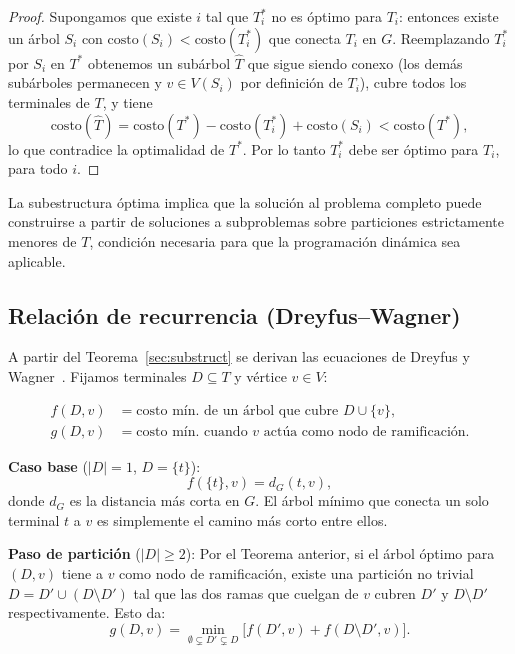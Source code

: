 \documentclass[11pt]{article}
\begin{document}
\begin{proof}
Supongamos que existe $i$ tal que $T^*_i$ no es \'optimo para $T_i$: entonces
existe un \'arbol $S_i$ con $\mathrm{costo}(S_i) < \mathrm{costo}(T^*_i)$ que
conecta $T_i$ en $G$.  Reemplazando $T^*_i$ por $S_i$ en $T^*$ obtenemos un
sub\'arbol $\hat{T}$ que sigue siendo conexo (los dem\'as sub\'arboles
permanecen y $v\in V(S_i)$ por definici\'on de $T_i$), cubre todos los
terminales de $T$, y tiene
\[
  \mathrm{costo}(\hat{T}) = \mathrm{costo}(T^*) - \mathrm{costo}(T^*_i)
                           + \mathrm{costo}(S_i)
                           < \mathrm{costo}(T^*),
\]
lo que contradice la optimalidad de $T^*$.  Por lo tanto $T^*_i$ debe ser
\'optimo para $T_i$, para todo $i$.
\end{proof}

La subestructura \'optima implica que la soluci\'on al problema completo puede
construirse a partir de soluciones a subproblemas sobre particiones estrictamente
menores de $T$, condici\'on necesaria para que la programaci\'on din\'amica sea
aplicable.

\subsection{Relaci\'on de recurrencia (Dreyfus--Wagner)}\label{sec:recurrence}

A partir del Teorema~\ref{sec:substruct} se derivan las ecuaciones de
Dreyfus y Wagner~\cite{DreyfusWagner1971}.  Fijamos terminales
$D\subseteq T$ y v\'ertice $v\in V$:

\begin{align}
  f(D, v) &= \text{costo m\'in.\ de un \'arbol que cubre } D\cup\{v\}, \label{eq:f}\\
  g(D, v) &= \text{costo m\'in.\ cuando $v$ act\'ua como nodo de ramificaci\'on.}\label{eq:g}
\end{align}

\noindent\textbf{Caso base} ($|D|=1$, $D=\{t\}$):
\[
  f(\{t\},v) = d_G(t,v),
\]
donde $d_G$ es la distancia m\'as corta en $G$.  El \'arbol m\'inimo que conecta
un solo terminal $t$ a $v$ es simplemente el camino m\'as corto entre ellos.

\noindent\textbf{Paso de partici\'on} ($|D|\ge 2$):
Por el Teorema anterior, si el \'arbol \'optimo para $(D,v)$ tiene a $v$ como
nodo de ramificaci\'on, existe una partici\'on no trivial $D=D'\cup(D\setminus D')$
tal que las dos ramas que cuelgan de $v$ cubren $D'$ y $D\setminus D'$
respectivamente.  Esto da:
\begin{equation}
  g(D, v) = \min_{\emptyset \subsetneq D' \subsetneq D}
            \bigl[f(D', v) + f(D\setminus D', v)\bigr]. \label{eq:g_rec}
\end{equation}
\end{document}
